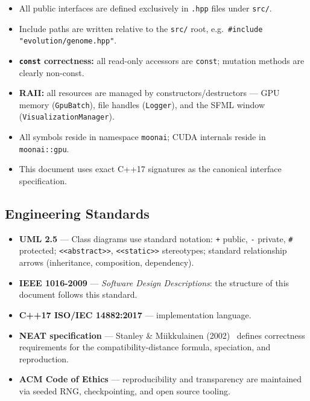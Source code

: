 \begin{itemize}
  \item All public interfaces are defined exclusively in \texttt{.hpp} files under
    \texttt{src/}.
  \item Include paths are written relative to the \texttt{src/} root, e.g.\
    \texttt{\#include "evolution/genome.hpp"}.
  \item \textbf{\texttt{const} correctness:} all read-only accessors are
    \texttt{const}; mutation methods are clearly non-const.
  \item \textbf{RAII:} all resources are managed by constructors/destructors —
    GPU memory (\texttt{GpuBatch}), file handles (\texttt{Logger}), and the SFML
    window (\texttt{VisualizationManager}).
  \item All symbols reside in namespace \texttt{moonai}; CUDA internals reside in
    \texttt{moonai::gpu}.
  \item This document uses exact C++17 signatures as the canonical interface specification.
\end{itemize}

\subsection{Engineering Standards}
\label{sec:standards}

\begin{itemize}
  \item \textbf{UML 2.5} — Class diagrams use standard notation: \texttt{+} public,
    \texttt{-} private, \texttt{\#} protected; \texttt{<<abstract>>},
    \texttt{<<static>>} stereotypes; standard relationship arrows (inheritance,
    composition, dependency).
  \item \textbf{IEEE 1016-2009} — \emph{Software Design Descriptions}: the structure of
    this document follows this standard.
  \item \textbf{C++17 ISO/IEC 14882:2017} — implementation language.
  \item \textbf{NEAT specification} — Stanley \& Miikkulainen (2002)~\cite{stanley2002}
    defines correctness requirements for the compatibility-distance formula, speciation,
    and reproduction.
  \item \textbf{ACM Code of Ethics} — reproducibility and transparency are maintained
    via seeded RNG, checkpointing, and open source tooling.
\end{itemize}

